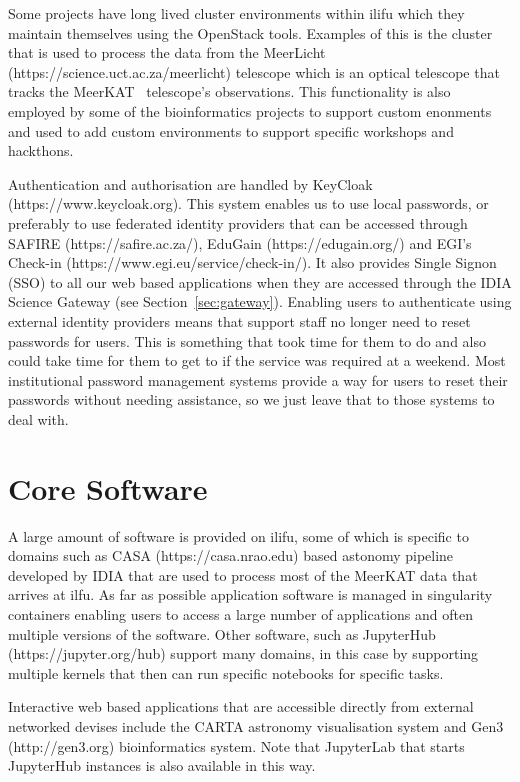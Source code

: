 \documentclass{iau_FM}
\begin{document}
Some projects have long lived cluster environments within ilifu which they maintain themselves using
the OpenStack tools.
Examples of this is the cluster that is used to process the data from the MeerLicht
 (https://science.uct.ac.za/meerlicht) telescope which
is an optical telescope that tracks the MeerKAT~\cite{meerkat} telescope's observations. 
This functionality
is also employed
by some of the bioinformatics projects to support custom enonments and used to add
custom environments to support specific workshops and hackthons.

Authentication and authorisation are handled by KeyCloak (https://www.keycloak.org). 
This system enables us 
to use local passwords,
or preferably to use federated identity providers that can be accessed through SAFIRE 
(https://safire.ac.za/), 
EduGain (https://edugain.org/) and EGI's Check-in (https://www.egi.eu/service/check-in/).
 It also provides Single Signon (SSO)
to all our 
web based applications when they are accessed through the 
IDIA Science Gateway (see Section~\ref{sec:gateway}).
Enabling users to authenticate using external identity providers means that support staff no longer need
to reset passwords for users. This is something that took time for them to do and also could take
time for them to get to if the service was required at a weekend. Most institutional password
management systems provide a way for users to reset their passwords without needing assistance,
so we just leave that to those systems to deal with.

\section{Core Software}
\label{sec:core_software}

A large amount of software is provided on ilifu, some of which is specific to domains such as CASA
(https://casa.nrao.edu) based
astonomy pipeline~\cite{pipelinepaper} 
developed by IDIA that are used to process most of the MeerKAT data that arrives
at ilfu. As far as possible application software is managed in singularity containers enabling users
to access a large number of applications and often multiple versions of the software. Other software, such
as JupyterHub (https://jupyter.org/hub) support many domains, in this case by 
supporting multiple
 kernels that then can run 
specific notebooks for specific tasks.

Interactive web based applications that are accessible directly from external networked devises include
the CARTA astronomy visualisation system and Gen3 (http://gen3.org) bioinformatics system. 
Note that JupyterLab that starts
JupyterHub instances is also available in this way.
\end{document}
